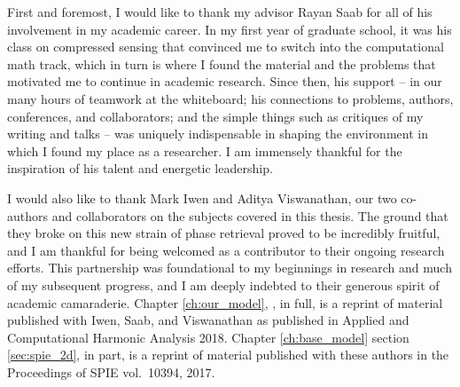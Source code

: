   First and foremost, I would like to thank my advisor Rayan Saab for all of his involvement in my academic career.  In my first year of graduate school, it was his class on compressed sensing that convinced me to switch into the computational math track, which in turn is where I found the material and the problems that motivated me to continue in academic research.  Since then, his support -- in our many hours of teamwork at the whiteboard; his connections to problems, authors, conferences, and collaborators; and the simple things such as critiques of my writing and talks -- was uniquely indispensable in shaping the environment in which I found my place as a researcher.  I am immensely thankful for the inspiration of his talent and energetic leadership.

  I would also like to thank Mark Iwen and Aditya Viswanathan, our two co-authors and collaborators on the subjects covered in this thesis.  The ground that they broke on this new strain of phase retrieval proved to be incredibly fruitful, and I am thankful for being welcomed as a contributor to their ongoing research efforts.  This partnership was foundational to my beginnings in research and much of my subsequent progress, and I am deeply indebted to their generous spirit of academic camaraderie.  Chapter \ref{ch:our_model}, , in full, is a reprint of material published with Iwen, Saab, and Viswanathan as published in Applied and Computational Harmonic Analysis 2018.  Chapter \ref{ch:base_model} section \ref{sec:spie_2d}, in part, is a reprint of material published with these authors in the Proceedings of SPIE vol.~10394, 2017.
